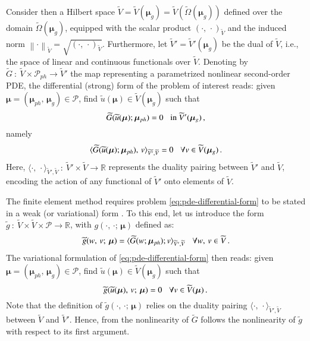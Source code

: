 \documentclass{elsarticle}
\theoremstyle{theorem}
\theoremstyle{definition}
\theoremstyle{remark}
\theoremstyle{proposition}
\numberwithin{figure}{section}
\newcommand{\norm}[1]{\left\lVert#1\right\rVert}
\newcommand{\wt}[1]{\widetilde{#1}}
\newcommand{\bg}[1]{\boldsymbol{#1}}
\begin{document}
		Consider then a Hilbert space $\wt{V} = \wt{V}(\bg{\mu}_g) = \wt{V}(\wt{\Omega}(\boldsymbol{\mu}_g))$ defined over the domain $\wt{\Omega}(\boldsymbol{\mu}_g)$, equipped with the scalar product $(\cdot, \, \cdot)_{\wt{V}}$ and the induced norm $\norm{\cdot}_{\wt{V}} = \sqrt{(\cdot, \, \cdot)_{\wt{V}}}$. Furthermore, let $\wt{V}' = \wt{V}'(\boldsymbol{\mu}_g)$ be the dual of $\wt{V}$, i.e., the space of linear and continuous functionals over $\wt{V}$. Denoting by $\wt{G} ~ : ~ \wt{V} \times \mathcal{P}_{ph} \rightarrow \wt{V}'$ the map representing a parametrized nonlinear second-order PDE, the differential (strong) form of the problem of interest reads: given $\bg{\mu} = (\bg{\mu}_{ph}, \, \bg{\mu}_g) \in \mathcal{P}$, find $\wt{u}(\boldsymbol{\mu}) \in \wt{V}(\bg{\mu}_g)$ such that
		\begin{equation}
			\label{eq:pde-differential-form}
			\wt{G}(\wt{u}(\bg{\mu}); \bg{\mu}_{ph}) = 0 \hspace*{0.3cm} \text{in $\wt{V}'(\bg{\mu}_g)$} \, ,
		\end{equation}
		namely
		\begin{equation*}
			\langle \wt{G}(\wt{u}(\bg{\mu}); \bg{\mu}_{ph}), \, v \rangle_{\wt{V'},\wt{V}} = 0 \hspace*{0.3cm} \forall v \in \wt{V}(\bg{\mu}_g) \, .
		\end{equation*}
		Here, $\langle \cdot, \, \cdot \rangle_{\wt{V}',\wt{V}} ~ : ~ \wt{V}' \times \wt{V} \rightarrow \mathbb{R}$ represents the duality pairing between $\wt{V}'$ and $\wt{V}$, encoding the action of any functional of $\wt{V}'$ onto elements of $\wt{V}$.
		
		The finite element method requires problem \eqref{eq:pde-differential-form} to be stated in a weak (or variational) form \cite{Qua10}. To this end, let us introduce the form $\wt{g} ~ : ~ \wt{V} \times \wt{V} \times \mathcal{P} \rightarrow \mathbb{R}$, with $g(\cdot, \, \cdot; \, \bg{\mu})$ defined as:
		\begin{equation*}
			\wt{g}(w, \, v; \, \bg{\mu}) = \langle \wt{G}(w; \bg{\mu}_{ph}); v \rangle_{\wt{V}',\wt{V}} \hspace*{0.3cm} \forall w, \, v \in \wt{V} \, .
		\end{equation*}
		The variational formulation of \eqref{eq:pde-differential-form} then reads: given $\bg{\mu} = (\bg{\mu}_{ph}, \, \bg{\mu}_g) \in \mathcal{P}$, find $\wt{u}(\bg{\mu}) \in \wt{V}(\bg{\mu}_g)$ such that
		\begin{equation}
			\label{eq:pde-variational-form}
			\wt{g}(\wt{u}(\bg{\mu}), \, v; \, \bg{\mu}) = 0 \hspace*{0.3cm} \forall v \in \wt{V}(\bg{\mu}) \, .
		\end{equation}
		Note that the definition of $\wt{g}(\cdot, \, \cdot; \, \bg{\mu})$ relies on the duality pairing $\langle \cdot, \, \cdot \rangle_{\wt{V}',\wt{V}}$ between $\wt{V}$ and $\wt{V}'$. Hence, from the nonlinearity of $\wt{G}$ follows the nonlinearity of $\wt{g}$ with respect to its first argument.
		
\end{document}

